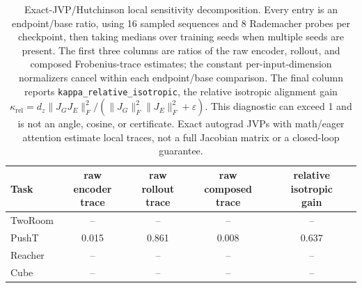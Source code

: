 \begin{table}[H]
\centering
\caption{Exact-JVP/Hutchinson local sensitivity decomposition. Every entry is an endpoint/base ratio, using 16 sampled sequences and 8 Rademacher probes per checkpoint, then taking medians over training seeds when multiple seeds are present. The first three columns are ratios of the raw encoder, rollout, and composed Frobenius-trace estimates; the constant per-input-dimension normalizers cancel within each endpoint/base comparison. The final column reports \texttt{kappa\_relative\_isotropic}, the relative isotropic alignment gain $\kappa_{\mathrm{rel}}=d_z\lVert J_GJ_E\rVert_F^2/(\lVert J_G\rVert_F^2\lVert J_E\rVert_F^2+\varepsilon)$. This diagnostic can exceed 1 and is not an angle, cosine, or certificate. Exact autograd JVPs with math/eager attention estimate local traces, not a full Jacobian matrix or a closed-loop guarantee.}
\label{tab:jvp-hutchinson-sensitivity-audit}
\small
\setlength{\tabcolsep}{3.5pt}
\begin{tabular}{lcccc}
\toprule
Task & \shortstack{raw encoder\\trace} & \shortstack{raw rollout\\trace} & \shortstack{raw composed\\trace} & \shortstack{relative isotropic\\gain} \\
\midrule
TwoRoom & -- & -- & -- & -- \\
PushT & 0.015 & 0.861 & 0.008 & 0.637 \\
Reacher & -- & -- & -- & -- \\
Cube & -- & -- & -- & -- \\
\bottomrule
\end{tabular}
\end{table}
